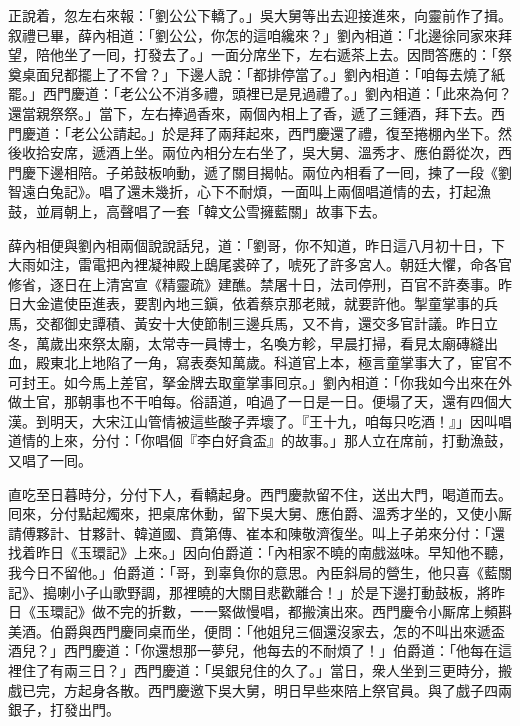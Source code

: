 正說着，忽左右來報：「劉公公下轎了。」吳大舅等出去迎接進來，向靈前作了揖。叙禮已畢，薛內相道：「劉公公，你怎的這咱纔來？」劉內相道：「北邊徐同家來拜望，陪他坐了一囘，打發去了。」一面分席坐下，左右遞茶上去。因問答應的：「祭奠桌面兒都擺上了不曾？」下邊人說：「都排停當了。」劉內相道：「咱每去燒了紙罷。」西門慶道：「老公公不消多禮，頭裡已是見過禮了。」劉內相道：「此來為何？還當親祭祭。」當下，左右捧過香來，兩個內相上了香，遞了三鍾酒，拜下去。西門慶道：「老公公請起。」於是拜了兩拜起來，西門慶還了禮，復至捲棚內坐下。然後收拾安席，遞酒上坐。兩位內相分左右坐了，吳大舅、溫秀才、應伯爵從次，西門慶下邊相陪。子弟鼓板响動，遞了關目揭帖。兩位內相看了一囘，揀了一段《劉智遠白兔記》。唱了還未幾折，心下不耐煩，一面叫上兩個唱道情的去，打起漁鼓，並肩朝上，高聲唱了一套「韓文公雪擁藍關」故事下去。

薛內相便與劉內相兩個說說話兒，道：「劉哥，你不知道，昨日這八月初十日，下大雨如注，雷電把內裡凝神殿上鴟尾裘碎了，唬死了許多宮人。朝廷大懼，命各官修省，逐日在上清宮宣《精靈疏》建醮。禁屠十日，法司停刑，百官不許奏事。昨日大金遣使臣進表，要割內地三鎭，依着蔡京那老賊，{}就要許他。掣童掌事的兵馬，交都御史譚積、黃安十大使節制三邊兵馬，又不肯，還交多官計議。昨日立冬，萬歲出來祭太廟，太常寺一員博士，名喚方軫，早晨打掃，看見太廟磚縫出血，殿東北上地陷了一角，{}寫表奏知萬歲。科道官上本，極言童掌事大了，宦官不可封王。如今馬上差官，拏金牌去取童掌事囘京。」劉內相道：「你我如今出來在外做土官，那朝事也不干咱每。俗語道，咱過了一日是一日。便塌了天，還有四個大漢。到明天，大宋江山管情被這些酸子弄壞了。{}『王十九，咱每只吃酒！』」因叫唱道情的上來，分付：「你唱個『李白好貪盃』的故事。」{}那人立在席前，打動漁鼓，又唱了一囘。

直吃至日暮時分，分付下人，看轎起身。西門慶款留不住，送出大門，喝道而去。囘來，分付點起燭來，把桌席休動，留下吳大舅、應伯爵、溫秀才坐的，又使小厮請傅夥計、甘夥計、韓道國、賁第傳、崔本和陳敬濟復坐。叫上子弟來分付：「還找着昨日《玉環記》上來。」因向伯爵道：「內相家不曉的南戲滋味。早知他不聽，我今日不留他。」伯爵道：「哥，到辜負你的意思。內臣斜局的營生，他只喜《藍關記》、搗喇小子山歌野調，那裡曉的大關目悲歡離合！」於是下邊打動鼓板，將昨日《玉環記》做不完的折數，一一緊做慢唱，都搬演出來。西門慶令小厮席上頻斟美酒。伯爵與西門慶同桌而坐，便問：「他姐兒三個還沒家去，怎的不叫出來遞盃酒兒？」{}西門慶道：「你還想那一夢兒，他每去的不耐煩了！」伯爵道：「他每在這裡住了有兩三日？」西門慶道：「吳銀兒住的久了。」當日，衆人坐到三更時分，搬戲已完，方起身各散。西門慶邀下吳大舅，明日早些來陪上祭官員。與了戲子四兩銀子，打發出門。

